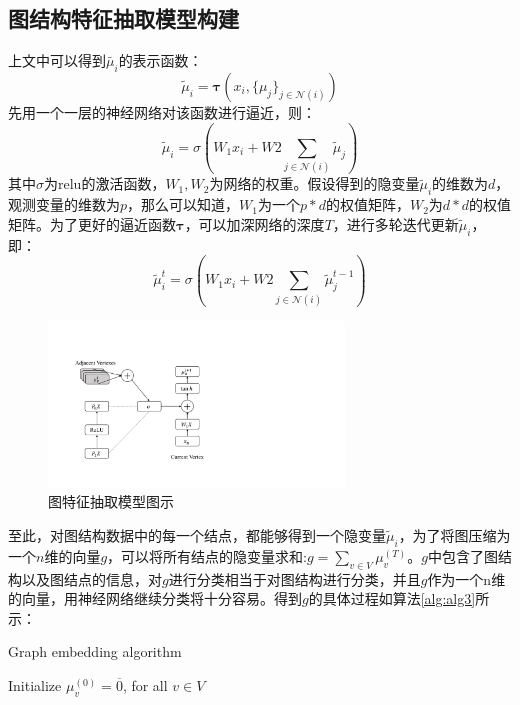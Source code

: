 \subsection{图结构特征抽取模型构建}
上文中可以得到$\tilde{\mu_i}$的表示函数：
\begin{equation}
\tilde{\mu}_i = \boldsymbol{\tau} (x_i, \{\mu_j\}_{j\in \mathcal{N}(i)})
\end{equation}
先用一个一层的神经网络对该函数进行逼近，则：
\begin{equation}
\tilde{\mu}_i = \sigma(W_1x_i + W2\sum_{j\in \mathcal{N}(i)}\tilde{\mu}_j)
\end{equation}
其中$\sigma$为relu的激活函数，$W_1, W_2$为网络的权重。假设得到的隐变量$\tilde{\mu}_i$的维数为$d$，观测变量的维数为$p$，那么可以知道，$W_1$为一个$p*d$的权值矩阵，$W_2$为$d*d$的权值矩阵。为了更好的逼近函数$\boldsymbol{\tau}$，可以加深网络的深度$T$，进行多轮迭代更新$\tilde{\mu}_i$， 即：
\begin{equation}
\tilde{\mu}_i^t = \sigma(W_1x_i + W2\sum_{j\in \mathcal{N}(i)}\tilde{\mu}_j^{t-1})
\end{equation}
\begin{figure}[htbp]
	\begin{center}
		\includegraphics[width=0.7\textwidth]{figures//5.pdf}
		\caption{图特征抽取模型图示}
		\label{default}
	\end{center}
\end{figure}
至此，对图结构数据中的每一个结点，都能够得到一个隐变量$\tilde{\mu}_i$，为了将图压缩为一个$n$维的向量$g$，可以将所有结点的隐变量求和:$g =\sum_{v\in V} \mu_v^{(T)}$。$g$中包含了图结构以及图结点的信息，对$g$进行分类相当于对图结构进行分类，并且$g$作为一个n维的向量，用神经网络继续分类将十分容易。得到$g$的具体过程如算法\ref{alg:alg3}所示：
\begin{algorithm}%
	\caption{Graph embedding algorithm}  
	Initialize $\mu_v^{(0)} = \overline{0}$, for all $v \in V$\\
	\label{alg:alg3}
\end{algorithm}
  
